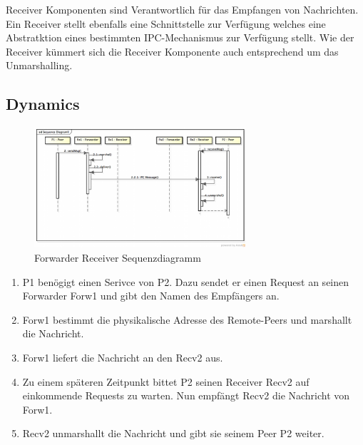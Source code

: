 Receiver Komponenten sind Verantwortlich für das Empfangen von Nachrichten. Ein Receiver stellt ebenfalls eine Schnittstelle zur Verfügung welches eine Abstratktion eines bestimmten IPC-Mechanismus zur Verfügung stellt. Wie der Receiver kümmert sich die Receiver Komponente auch entsprechend um das Unmarshalling.

\subsection*{Dynamics}

\begin{figure}[H]
	\centering
	\includegraphics[width=0.7\textwidth]{content/posa1/images/forwarder-receiver-sequence.png}
	\caption{Forwarder Receiver Sequenzdiagramm}
\end{figure}


\begin{enumerate}
	\item P1 benögigt einen Serivce von P2. Dazu sendet er einen Request an seinen Forwarder Forw1 und gibt den Namen des Empfängers an.
	\item Forw1 bestimmt die physikalische Adresse des Remote-Peers und marshallt die Nachricht.
	\item Forw1 liefert die Nachricht an den Recv2 aus.
	\item Zu einem späteren Zeitpunkt bittet P2 seinen Receiver Recv2 auf einkommende Requests zu warten. Nun empfängt Recv2 die Nachricht von Forw1.
	\item Recv2 unmarshallt die Nachricht und gibt sie seinem Peer P2 weiter.
\end{enumerate}


